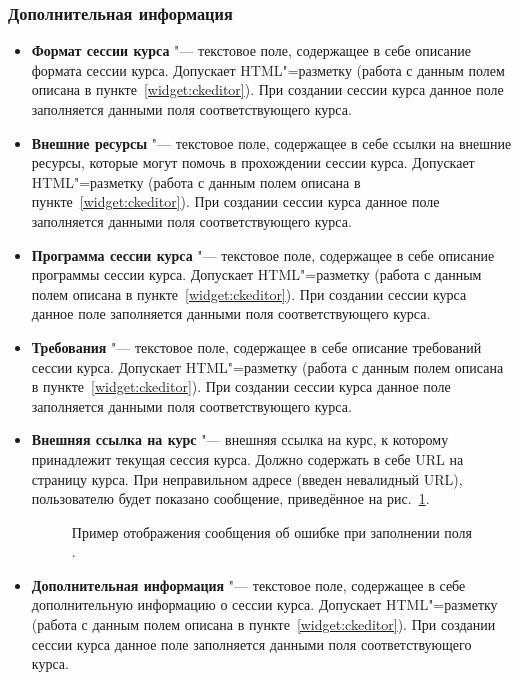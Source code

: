 \subsubsection{Дополнительная информация}
	\begin{itemize}
		\item \textbf{Формат сессии курса} "--- текстовое поле, содержащее в себе описание формата сессии курса. Допускает HTML"=разметку (работа с данным полем описана в пункте~\ref{widget:ckeditor}).
		При создании сессии курса данное поле заполняется данными поля  соответствующего курса.
		
		\item \textbf{Внешние ресурсы} "--- текстовое поле, содержащее в себе ссылки на внешние ресурсы, которые могут помочь в прохождении сессии курса. Допускает HTML"=разметку (работа с данным полем описана в пункте~\ref{widget:ckeditor}). При создании сессии курса данное поле заполняется данными поля  соответствующего курса.
		
		\item \textbf{Программа сессии курса} "--- текстовое поле, содержащее в себе описание программы сессии курса. Допускает HTML"=разметку (работа с данным полем описана в пункте~\ref{widget:ckeditor}). При создании сессии курса данное поле заполняется данными поля  соответствующего курса.
		
		\item \textbf{Требования} "--- текстовое поле, содержащее в себе описание требований сессии курса. Допускает HTML"=разметку (работа с данным полем описана в пункте~\ref{widget:ckeditor}). При создании сессии курса данное поле заполняется данными поля  соответствующего курса.
		
		\item \textbf{Внешняя ссылка на курс} "--- внешняя ссылка на курс, к которому принадлежит текущая сессия курса. Должно содержать в себе URL на страницу курса. При неправильном адресе (введен невалидный URL), пользователю будет показано сообщение, приведённое на рис.~\ref{img:course_session:url-error}.
		\begin{figure}[H]
			\caption{Пример отображения сообщения об ошибке при заполнении поля .}
			\label{img:course_session:url-error}
		\end{figure}
		
		\item \textbf{Дополнительная информация} "--- текстовое поле, содержащее в себе дополнительную информацию о сессии курса. Допускает HTML"=разметку (работа с данным полем описана в пункте~\ref{widget:ckeditor}). При создании сессии курса данное поле заполняется данными поля  соответствующего курса.
		

\end{itemize}
